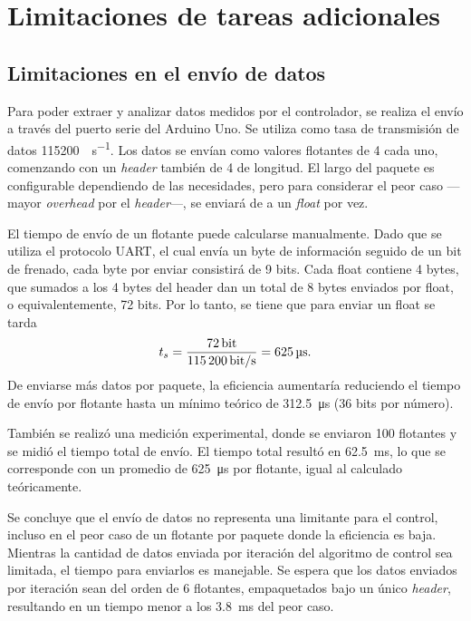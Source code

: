 \section{Limitaciones de tareas adicionales}

\subsection{Limitaciones en el envío de datos}

Para poder extraer y analizar datos medidos por el controlador, se realiza el envío a través del puerto serie del Arduino Uno. Se utiliza como tasa de transmisión de datos \qty{115200}{\bit\per\s}. Los datos se envían como valores flotantes de \qty{4}{\byte} cada uno, comenzando con un \emph{header} también de \qty{4}{\byte} de longitud. El largo del paquete es configurable dependiendo de las necesidades, pero para considerar el peor caso ---mayor \emph{overhead} por el \emph{header}---, se enviará de a un \emph{float} por vez.

El tiempo de envío de un flotante puede calcularse manualmente. Dado que se utiliza el protocolo UART, el cual envía un byte de información seguido de un bit de frenado, cada byte por enviar consistirá de 9 bits. Cada float contiene 4 bytes, que sumados a los 4 bytes del header dan un total de 8 bytes enviados por float, o equivalentemente, 72 bits. Por lo tanto, se tiene que para enviar un float se tarda
$$t_s = \frac{\qty{72}{\bit}}{\qty{115200}{\bit\per\s}} = \qty{625}{\us}.$$
De enviarse más datos por paquete, la eficiencia aumentaría reduciendo el tiempo de envío por flotante hasta un mínimo teórico de \qty{312.5}{\us} (36 bits por número).

También se realizó una medición experimental, donde se enviaron 100 flotantes y se midió el tiempo total de envío. El tiempo total resultó en \qty{62.5}{\ms}, lo que se corresponde con un promedio de \qty{625}{\us} por flotante, igual al calculado teóricamente.

Se concluye que el envío de datos no representa una limitante para el control, incluso en el peor caso de un flotante por paquete donde la eficiencia es baja. Mientras la cantidad de datos enviada por iteración del algoritmo de control sea limitada, el tiempo para enviarlos es manejable. Se espera que los datos enviados por iteración sean del orden de 6 flotantes, empaquetados bajo un único \emph{header}, resultando en un tiempo menor a los \qty{3.8}{\ms} del peor caso.

